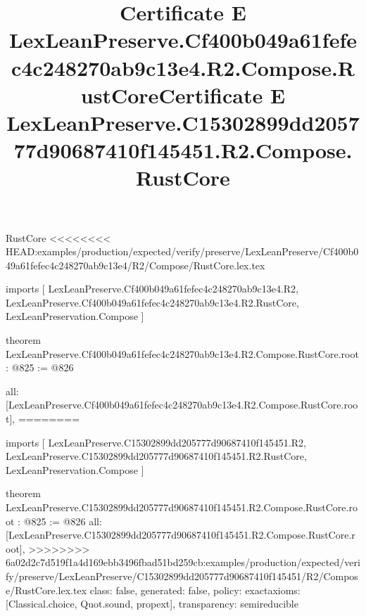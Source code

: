 \begin{lexlean}{RustCore}
<<<<<<<< HEAD:examples/production/expected/verify/preserve/LexLeanPreserve/Cf400b049a61fefec4c248270ab9c13e4/R2/Compose/RustCore.lex.tex
\title{Certificate E LexLeanPreserve.Cf400b049a61fefec4c248270ab9c13e4.R2.Compose.RustCore}
\begin{coremodule}
imports [
  LexLeanPreserve.Cf400b049a61fefec4c248270ab9c13e4.R2,
  LexLeanPreserve.Cf400b049a61fefec4c248270ab9c13e4.R2.RustCore,
  LexLeanPreservation.Compose
]

theorem LexLeanPreserve.Cf400b049a61fefec4c248270ab9c13e4.R2.Compose.RustCore.root : @825 := @826 {
  all: [LexLeanPreserve.Cf400b049a61fefec4c248270ab9c13e4.R2.Compose.RustCore.root],
========
\title{Certificate E LexLeanPreserve.C15302899dd205777d90687410f145451.R2.Compose.RustCore}
\begin{coremodule}
imports [
  LexLeanPreserve.C15302899dd205777d90687410f145451.R2,
  LexLeanPreserve.C15302899dd205777d90687410f145451.R2.RustCore,
  LexLeanPreservation.Compose
]

theorem LexLeanPreserve.C15302899dd205777d90687410f145451.R2.Compose.RustCore.root : @825 := @826 {
  all: [LexLeanPreserve.C15302899dd205777d90687410f145451.R2.Compose.RustCore.root],
>>>>>>>> 6a02d2c7d519f1a4d169ebb3496fbad51bd259cb:examples/production/expected/verify/preserve/LexLeanPreserve/C15302899dd205777d90687410f145451/R2/Compose/RustCore.lex.tex
  class: false,
  generated: false,
  policy: exact{axioms: [Classical.choice, Quot.sound, propext]},
  transparency: semireducible
}


\end{coremodule}}
\end{coremodule}
\end{lexlean}
